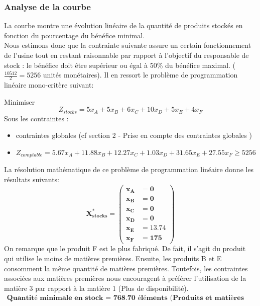 \documentclass[12pt]{article}
\begin{document}
\subsubsection*{Analyse de la courbe}
La courbe montre une évolution linéaire de la quantité de produits stockés en fonction du pourcentage du bénéfice minimal.\\
Nous estimons donc que la contrainte suivante assure un certain fonctionnement de l'usine tout en restant raisonnable par rapport à l'objectif du responsable de stock : le bénéfice doit être supérieur ou égal à 50\% du bénéfice maximal. ($\frac{10512}{2} = 5256$ unités monétaires).
\newpage 
Il en ressort le problème de programmation linéaire mono-critère suivant:
\begin{tcolorbox}
Minimiser
\begin{equation*}
 Z_{stocks}= 5x_{A} + 5x_{B} + 6x_{C} + 10x_{D} + 5x_{E} + 4x_{F}
\end{equation*}
Sous les contraintes :
\begin{itemize}
\item contraintes globales (cf section 2 - Prise en compte des contraintes globales )
\item $Z_{comptable}= 5.67x_{A} +11.88x_{B} +12.27x_{C} +1.03x_{D} +31.65x_{E} +27.55x_{F} \geq 5256$
\end{itemize}
\end{tcolorbox}
La résolution mathématique de ce problème de programmation linéaire donne les résultats suivants:
\begin{equation*}
\boldsymbol{X^{*}_{stocks} = 
   \left (
   \begin{aligned}
      x_{A} &= 0 \\
      x_{B} &= 0 \\
      x_{C} &= 0 \\
      x_{D} &= 0 \\
      x_{E} &= 13.74 \\
      x_{F} &= 175 
   \end{aligned}
   \right )
 } 
\end{equation*}
On remarque que le produit F est le plus fabriqué. De fait, il s'agit du produit qui utilise le moins de matières premières. Ensuite, les produits B et E consomment la même quantité de matières premières. Toutefois, les contraintes associées aux matières premières nous encouragent à préférer l'utilisation de la matière 3 par rapport à la matière 1 (Plus de disponibilité).
\begin{align*}
\textbf{Quantité minimale en stock = 768.70 éléments (Produits et matières premières)}
\end{align*}
\end{document}
